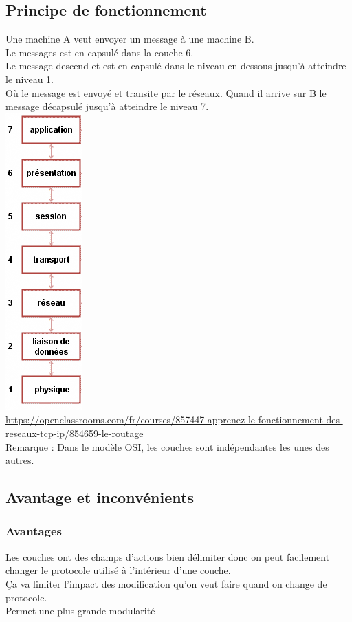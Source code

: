 \documentclass{article}
\begin{document}
\subsection{Principe de fonctionnement}
Une machine A veut envoyer un message à une machine B. \\
Le messages est en-capsulé dans la couche 6. \\
Le message descend et est en-capsulé dans le niveau en dessous jusqu’à atteindre le niveau 1. \\
Où le message est envoyé et transite par le réseaux. Quand il arrive sur B le message décapsulé jusqu’à atteindre le niveau 7. \\  
\includegraphics{image/modele_OSI.png} \\ 
\url{https://openclassrooms.com/fr/courses/857447-apprenez-le-fonctionnement-des-reseaux-tcp-ip/854659-le-routage}
\\
Remarque : Dans le modèle OSI, les couches sont indépendantes les unes des autres.
\subsection{Avantage et inconvénients}
\subsubsection*{Avantages}
Les couches ont des champs d’actions bien délimiter donc on peut facilement changer le protocole utilisé à l’intérieur d’une couche. \\
Ça va limiter l’impact des modification qu’on veut faire quand on change de protocole. \\
Permet une plus grande modularité \\
\end{document}
